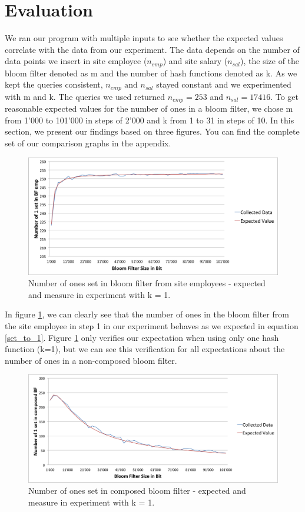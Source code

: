 \documentclass[12]{scrartcl}
\begin{document}
\section{Evaluation}
We ran our program with multiple inputs to see whether the expected values correlate with the data from our experiment. The data depends on the number of data points we insert in site employee ($n_{emp}$) and site salary ($n_{sal}$), the size of the bloom filter denoted as m and the number of hash functions denoted as k. As we kept the queries consistent, $n_{emp} \text{ and } n_{sal}$ stayed constant and we experimented with m and k. The queries we used returned $n_{emp} = 253$ and $n_{sal} = 17416$. To get reasonable expected values for the number of ones in a bloom filter, we chose m from 1'000 to 101'000 in steps of 2'000 and k from 1 to 31 in steps of 10.
In this section, we present our findings based on three figures. You can find the complete set of our comparison graphs in the appendix.
\begin{figure}[H]
	\begin{center}
		\includegraphics[scale=0.4]{res/1-emp.png}
	\end{center}
	\caption{Number of ones set in bloom filter from site employees - expected and measure in experiment with k = 1.}
	\label{fig:eval1}
\end{figure}
In figure \ref{fig:eval1}, we can clearly see that the number of ones in the bloom filter from the site employee in step 1 in our experiment behaves as we expected in equation \ref{set_to_1}. Figure \ref{fig:eval1} only verifies our expectation when using only one hash function (k=1), but we can see this verification for all expectations about the number of ones in a non-composed bloom filter.
\begin{figure}[H]
	\begin{center}
		\includegraphics[scale=0.4]{res/1-composed.png}
	\end{center}
	\caption{Number of ones set in composed bloom filter - expected and measure in experiment with k = 1.}
	\label{fig:eval2}
\end{figure}
\end{document}

